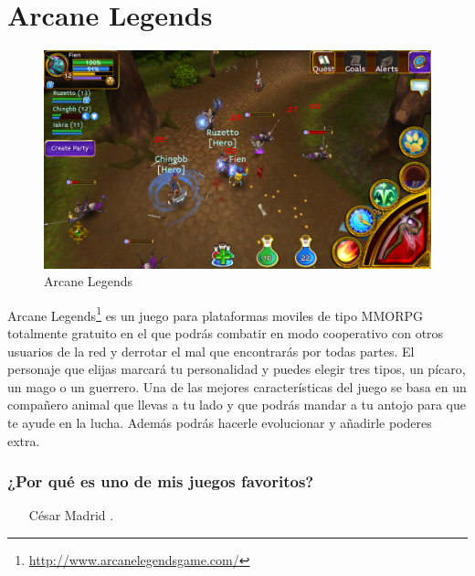 \section{Arcane Legends}

\begin{figure}[htbp]
\begin{center}
\includegraphics[width=.60\textwidth]{./imagenes/arcanelegends.png}
\caption{Arcane Legends}
\label{Arcane Legends}
\end{center}
\end{figure}
Arcane Legends\footnote{\url{http://www.arcanelegendsgame.com/}} es un juego para plataformas moviles  de tipo MMORPG totalmente gratuito en el que podrás combatir en modo cooperativo con otros usuarios de la red y derrotar el mal que encontrarás por todas partes. El personaje que elijas marcará tu personalidad y puedes elegir tres tipos, un pícaro, un mago o un guerrero. Una de las mejores características del juego se basa en un compañero animal que llevas a tu lado y que podrás mandar a tu antojo para que te ayude en la lucha. Además podrás hacerle evolucionar y añadirle poderes extra.

\subsubsection{¿Por qué es uno de mis juegos favoritos?}
\begin{itemize}
\item[César Madrid].
\end{itemize}
